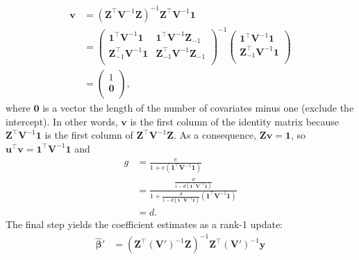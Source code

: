 \documentclass[11pt]{article}
\begin{document}
\begin{appendices}
  \begin{align*}
    \mathbf{v}
    &=
      \left( \mathbf{Z}^\intercal \mathbf{V}^{-1} \mathbf{Z} \right)^{-1} \mathbf{Z}^\intercal \mathbf{V}^{-1} \mathbf{1}
      \\
    &=
      \begin{pmatrix}
        \mathbf{1}^\intercal \mathbf{V}^{-1} \mathbf{1} & \mathbf{1}^\intercal \mathbf{V}^{-1} \mathbf{Z}_{-1} \\
        \mathbf{Z}_{-1}^\intercal \mathbf{V}^{-1} \mathbf{1} & \mathbf{Z}_{-1}^\intercal \mathbf{V}^{-1} \mathbf{Z}_{-1} \\
      \end{pmatrix}^{-1}
      \begin{pmatrix}
        \mathbf{1}^\intercal \mathbf{V}^{-1} \mathbf{1} \\
        \mathbf{Z}_{-1}^\intercal \mathbf{V}^{-1} \mathbf{1} \\
      \end{pmatrix}
    \\
    &=
      \begin{pmatrix}
        1 \\
        \mathbf{0} \\
      \end{pmatrix}
      ,
  \end{align*}
  where $\mathbf{0}$ is a vector the length of the number of covariates minus one (exclude the intercept).
  In other words, $\mathbf{v}$ is the first column of the identity matrix because $\mathbf{Z}^\intercal \mathbf{V}^{-1} \mathbf{1}$ is the first column of $\mathbf{Z}^\intercal \mathbf{V}^{-1} \mathbf{Z}$.
  As a consequence, $\mathbf{Z} \mathbf{v} = \mathbf{1}$, so $\mathbf{u}^\intercal \mathbf{v} = \mathbf{1}^\intercal \mathbf{V}^{-1} \mathbf{1}$ and
  \begin{align*}
    g
    &=
      \frac{ e } {1 + e (\mathbf{1}^\intercal \mathbf{V}^{-1} \mathbf{1}) }
    \\
    &=
      \frac{
      \frac{ d }{ 1 - d \left( \mathbf{1}^\intercal \mathbf{V}^{-1} \mathbf{1} \right) }
      } {
      1 + \frac{ d }{ 1 - d \left( \mathbf{1}^\intercal \mathbf{V}^{-1} \mathbf{1} \right) } (\mathbf{1}^\intercal \mathbf{V}^{-1} \mathbf{1})
      }
    \\
    &=
      d
      .
  \end{align*}
  The final step yields the coefficient estimates as a rank-1 update:
  \begin{align*}
    \boldsymbol{\hat{\beta}}'
    &=
      \left( \mathbf{Z}^\intercal \left( \mathbf{V}' \right) ^{-1} \mathbf{Z} \right)^{-1} \mathbf{Z}^\intercal \left( \mathbf{V}' \right)^{-1} \mathbf{y}

\end{align*}
\end{appendices}
\end{document}
